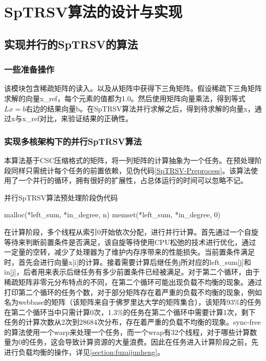 \chapter{SpTRSV算法的设计与实现}

\section{实现并行的SpTRSV的算法}

\subsection{一些准备操作}
该模块包含稀疏矩阵的读入。以及从矩阵中获得下三角矩阵。假设稀疏下三角矩阵求解的向量x\_ref，每个元素的值都为1.0。然后使用矩阵向量乘法，得到等式$Lx=b$右边的结果向量b。在SpTRSV算法并行求解之后，得到待求解的向量x，通过x与x\_ref对比，来验证结果的正确性。

\subsection{实现多核架构下的并行SpTRSV算法}

本算法基于CSC压缩格式的矩阵，将一列矩阵的计算抽象为一个任务。在预处理阶段同样只需统计每个任务的前置依赖，见伪代码\ref{SpTRSV-Preprocess}。该算法使用了一个并行的循环，拥有很好的扩展性，占总体运行的时间可以忽略不记。

\begin{algorithm}[htbp]
    \caption{并行SpTRSV算法预处理阶段伪代码\label{SpTRSV-Preprocess}}
    malloc(*left\_sum, *in\_degree, n)\;
    memset(*left\_sum, *in\_degree, 0)\;
\end{algorithm}

在计算阶段，多个线程从索引0开始依次分配，进行并行计算。首先通过一个自旋等待来判断前置条件是否满足，该自旋等待使用CPU松弛的技术进行优化，通过一定量的空转，减少了处理器为了维护内存序带来的性能损失。当前置条件满足时，首先会进行向量x[i]的计算。接着需要计算后继任务j所对应的left\_sum[j]和in[j]，后者用来表示后继任务有多少前置条件已经被满足。对于第二个循环，由于稀疏矩阵非零元分布特点的不同，在第二个循环可能出现负载不均衡的现象。通过打印第二个循环的任务个数，对于部分矩阵存在着严重的负载不均衡的现象，例如名为webbase的矩阵（该矩阵来自于佛罗里达大学的矩阵集合\cite{davis2011university}），该矩阵93\%的任务在第二个循环当中只需计算0次，1.3\%的任务在第二个循环中需要计算1次，剩下任务的计算次数从2次到28684次分布，存在着严重的负载不均衡的现象。sync-free的算法使用一个warp来处理一个任务，而一个wrap有32个线程，对于哪些计算数量为0的任务，这会导致计算资源的大量浪费。因此在任务进入计算阶段之前，先进行负载均衡的操作，详见\ref{section:fuzaijunheng}。


